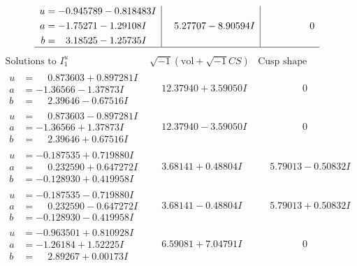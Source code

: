 \documentclass[1p]{elsarticle_modified}
\theoremstyle{definition}
\newcommand{\I}{\sqrt{-1}}
\begin{document}
$$\begin{array}{c|c|c}
\begin{aligned}
u &= -0.945789 - 0.818483 I \\
a &= -1.75271 - 1.29108 I \\
b &= \phantom{-}3.18525 - 1.25735 I\end{aligned}
 & \phantom{-}5.27707 - 8.90594 I & \phantom{-0.000000 } 0\\
 \hline 
 \end{array}$$\newpage$$\begin{array}{c|c|c}  
\text{Solutions to }I^u_{1}& \I (\text{vol} + \sqrt{-1}CS) & \text{Cusp shape}\\
 \hline 
\begin{aligned}
u &= \phantom{-}0.873603 + 0.897281 I \\
a &= -1.36566 - 1.37873 I \\
b &= \phantom{-}2.39646 - 0.67516 I\end{aligned}
 & \phantom{-}12.37940 + 3.59050 I & \phantom{-0.000000 } 0 \\ \hline\begin{aligned}
u &= \phantom{-}0.873603 - 0.897281 I \\
a &= -1.36566 + 1.37873 I \\
b &= \phantom{-}2.39646 + 0.67516 I\end{aligned}
 & \phantom{-}12.37940 - 3.59050 I & \phantom{-0.000000 } 0 \\ \hline\begin{aligned}
u &= -0.187535 + 0.719880 I \\
a &= \phantom{-}0.232590 + 0.647272 I \\
b &= -0.128930 + 0.419958 I\end{aligned}
 & \phantom{-}3.68141 + 0.48804 I & \phantom{-}5.79013 - 0.50832 I \\ \hline\begin{aligned}
u &= -0.187535 - 0.719880 I \\
a &= \phantom{-}0.232590 - 0.647272 I \\
b &= -0.128930 - 0.419958 I\end{aligned}
 & \phantom{-}3.68141 - 0.48804 I & \phantom{-}5.79013 + 0.50832 I \\ \hline\begin{aligned}
u &= -0.963501 + 0.810928 I \\
a &= -1.26184 + 1.52225 I \\
b &= \phantom{-}2.89267 + 0.00173 I\end{aligned}
 & \phantom{-}6.59081 + 7.04791 I & \phantom{-0.000000 } 0 \\ \hline\begin{aligned}

\end{aligned}
\end{array}$$
\end{document}

